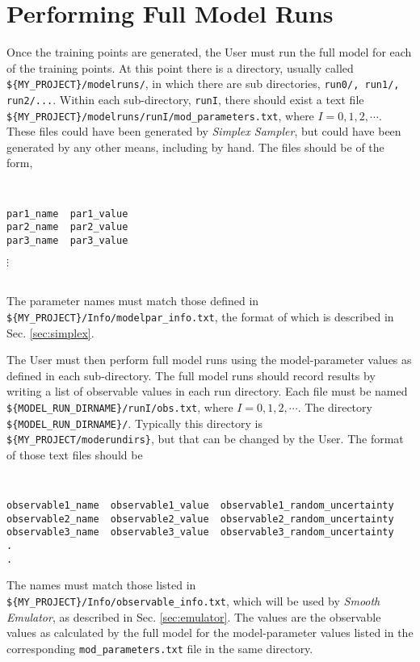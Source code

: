 \documentclass[UserManual.tex]{subfiles}
\begin{document}
\setcounter{section}{3}
\section{Performing Full Model Runs}\label{sec:fullmodel}

Once the training points are generated, the User must run the full model for each of the training points. At this point there is a directory, usually called {\tt \$\{MY\_PROJECT\}/modelruns/}, in which there are sub directories, {\tt run0/, run1/, run2/...}.  Within each sub-directory, {\tt runI}, there should exist a text file {\tt \$\{MY\_PROJECT\}/modelruns/runI/mod\_parameters.txt}, where $I=0,1,2,\cdots$. These files could have been generated by {\it Simplex Sampler}, but could have been generated by any other means, including by hand. The files should be of the form,
{\tt
\begin{verbatim}
par1_name  par1_value
par2_name  par2_value
par3_name  par3_value
\end{verbatim}\vspace*{-20pt}\hspace*{24pt}$\vdots$
}\\
The parameter names must match those defined in {\tt \$\{MY\_PROJECT\}/Info/modelpar\_info.txt}, the format of which is described in Sec. \ref{sec:simplex}. 

The User must then perform full model runs using the model-parameter values as defined in each sub-directory. The full model runs should record results by writing a list of observable values in each run directory. Each file must be named {\tt \$\{MODEL\_RUN\_DIRNAME\}/runI/obs.txt}, where $I=0,1,2,\cdots$. The directory {\tt \$\{MODEL\_RUN\_DIRNAME\}/}. Typically this directory is\\{\tt \$\{MY\_PROJECT/moderundirs\}}, but that can be changed by the User. The format of those text files should be
{\tt
\begin{verbatim}
observable1_name  observable1_value  observable1_random_uncertainty
observable2_name  observable2_value  observable2_random_uncertainty
observable3_name  observable3_value  observable3_random_uncertainty
.
.
\end{verbatim}
}
The names must match those listed in {\tt \$\{MY\_PROJECT\}/Info/observable\_info.txt}, which will be used by {\it Smooth Emulator}, as described in Sec. \ref{sec:emulator}. The values are the observable values as calculated by the full model for the model-parameter values listed in the corresponding {\tt mod\_parameters.txt} file in the same directory.
\end{document}
